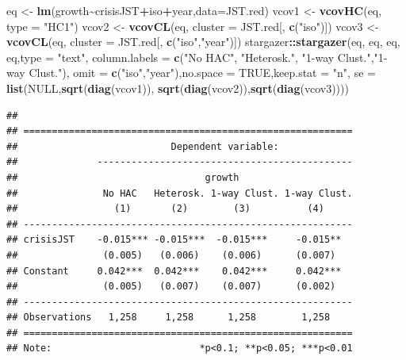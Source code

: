 \documentclass[
  12pt,
]{book}
\newenvironment{Shaded}{\begin{snugshade}}{\end{snugshade}}
\newcommand{\AttributeTok}[1]{\textcolor[rgb]{0.13,0.29,0.53}{#1}}
\newcommand{\ConstantTok}[1]{\textcolor[rgb]{0.56,0.35,0.01}{#1}}
\newcommand{\FunctionTok}[1]{\textcolor[rgb]{0.13,0.29,0.53}{\textbf{#1}}}
\newcommand{\NormalTok}[1]{#1}
\newcommand{\OtherTok}[1]{\textcolor[rgb]{0.56,0.35,0.01}{#1}}
\newcommand{\SpecialCharTok}[1]{\textcolor[rgb]{0.81,0.36,0.00}{\textbf{#1}}}
\newcommand{\StringTok}[1]{\textcolor[rgb]{0.31,0.60,0.02}{#1}}
\theoremstyle{definition}
\theoremstyle{definition}
\theoremstyle{definition}
\theoremstyle{definition}
\theoremstyle{remark}
\begin{document}
\begin{Shaded}
\begin{Highlighting}[]
\NormalTok{eq }\OtherTok{\textless{}{-}} \FunctionTok{lm}\NormalTok{(growth}\SpecialCharTok{\textasciitilde{}}\NormalTok{crisisJST}\SpecialCharTok{+}\NormalTok{iso}\SpecialCharTok{+}\NormalTok{year,}\AttributeTok{data=}\NormalTok{JST.red)}
\NormalTok{vcov1 }\OtherTok{\textless{}{-}} \FunctionTok{vcovHC}\NormalTok{(eq, }\AttributeTok{type =} \StringTok{"HC1"}\NormalTok{)}
\NormalTok{vcov2 }\OtherTok{\textless{}{-}} \FunctionTok{vcovCL}\NormalTok{(eq, }\AttributeTok{cluster =}\NormalTok{ JST.red[, }\FunctionTok{c}\NormalTok{(}\StringTok{"iso"}\NormalTok{)])}
\NormalTok{vcov3 }\OtherTok{\textless{}{-}} \FunctionTok{vcovCL}\NormalTok{(eq, }\AttributeTok{cluster =}\NormalTok{ JST.red[, }\FunctionTok{c}\NormalTok{(}\StringTok{"iso"}\NormalTok{,}\StringTok{"year"}\NormalTok{)])}
\NormalTok{stargazer}\SpecialCharTok{::}\FunctionTok{stargazer}\NormalTok{(eq, eq, eq, eq,}\AttributeTok{type =} \StringTok{"text"}\NormalTok{,}
                     \AttributeTok{column.labels =} \FunctionTok{c}\NormalTok{(}\StringTok{"No HAC"}\NormalTok{, }\StringTok{"Heterosk."}\NormalTok{,}
                                       \StringTok{"1{-}way Clust."}\NormalTok{,}\StringTok{"1{-}way Clust."}\NormalTok{),}
                     \AttributeTok{omit =} \FunctionTok{c}\NormalTok{(}\StringTok{"iso"}\NormalTok{,}\StringTok{"year"}\NormalTok{),}\AttributeTok{no.space =} \ConstantTok{TRUE}\NormalTok{,}\AttributeTok{keep.stat =} \StringTok{"n"}\NormalTok{,}
                     \AttributeTok{se =} \FunctionTok{list}\NormalTok{(}\ConstantTok{NULL}\NormalTok{,}\FunctionTok{sqrt}\NormalTok{(}\FunctionTok{diag}\NormalTok{(vcov1)),}
                               \FunctionTok{sqrt}\NormalTok{(}\FunctionTok{diag}\NormalTok{(vcov2)),}\FunctionTok{sqrt}\NormalTok{(}\FunctionTok{diag}\NormalTok{(vcov3))))}
\end{Highlighting}
\end{Shaded}

\begin{verbatim}
## 
## ==========================================================
##                           Dependent variable:             
##              ---------------------------------------------
##                                 growth                    
##               No HAC   Heterosk. 1-way Clust. 1-way Clust.
##                 (1)       (2)        (3)          (4)     
## ----------------------------------------------------------
## crisisJST    -0.015*** -0.015***  -0.015***     -0.015**  
##               (0.005)   (0.006)    (0.006)      (0.007)   
## Constant     0.042***  0.042***    0.042***     0.042***  
##               (0.005)   (0.007)    (0.007)      (0.002)   
## ----------------------------------------------------------
## Observations   1,258     1,258      1,258        1,258    
## ==========================================================
## Note:                          *p<0.1; **p<0.05; ***p<0.01
\end{verbatim}
\end{document}
